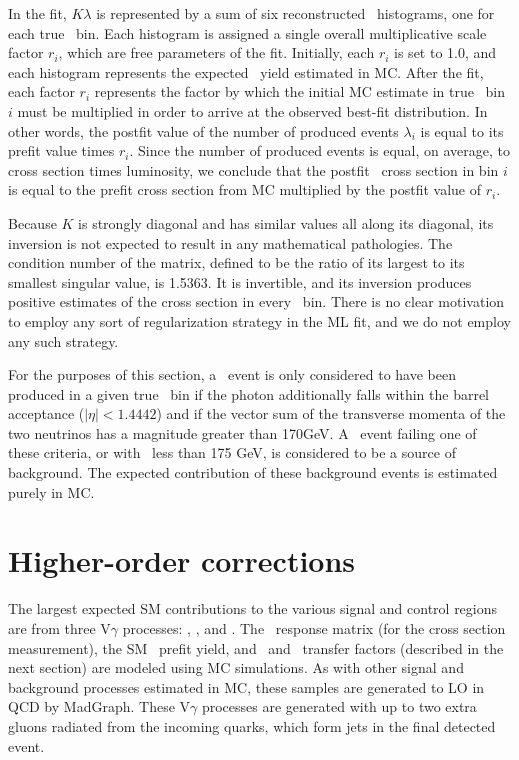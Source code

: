 In the fit, $K \lambda$ is represented by a sum of six reconstructed \ETgamma\ histograms, one for each true \pTgamma\ bin. Each histogram is assigned a single overall
multiplicative scale factor $r_{i}$, which are free parameters of the fit.
Initially, each $r_{i}$ is set to 1.0, and each histogram represents the expected \zinvg\ yield estimated in MC. After the fit, each factor $r_{i}$ represents the factor
by which the initial MC estimate in true \ETgamma\ bin $i$ must be multiplied in order to arrive at the observed best-fit distribution. In other words, the postfit value
of the number of produced events $\lambda_{i}$ is equal to its prefit value times $r_{i}$.
Since the number of produced events is equal, on average, to cross section times luminosity, we conclude that the postfit \zinvg\ cross
section in bin $i$ is equal to the prefit cross section from MC multiplied by the postfit value of $r_{i}$.

Because $K$ is strongly diagonal and has similar values all along its diagonal, its inversion is not expected to result in any mathematical pathologies.
The condition number of the matrix, defined to be the ratio of its largest to its smallest singular value, is 1.5363. It is invertible, and
its inversion produces positive estimates of the cross section in every \ETgamma\ bin. There is no clear motivation to employ any sort of regularization
strategy in the ML fit, and we do not employ any such strategy.

For the purposes of this section, a \zinvg\ event is only considered to
have been produced in a given true \pTgamma\ bin if the photon additionally falls within the barrel acceptance ($|\eta| < 1.4442$) and
if the vector sum of the transverse momenta of the two neutrinos has a magnitude greater than 170\unit{GeV}. A \zinvg\ event failing one of these
criteria, or with \ETgamma\ less than 175 GeV, is considered to be a source of background. The expected contribution of these background events is estimated
purely in MC.

\section{Higher-order corrections}
The largest expected SM contributions to the various signal and control regions are from three $\mathrm{V}\gamma$
processes: \zinvg, \wlng, and \zllg.
The \zinvg\ response matrix (for the cross section measurement), the SM \zinvg\ prefit yield,
and \wlng\ and \zllg\ transfer factors (described in the next section) are modeled using MC simulations.
As with other signal and background processes estimated in MC, these samples are generated to LO in QCD by MadGraph.
These $\mathrm{V}\gamma$ processes are generated with up to two extra gluons radiated from the incoming quarks,
which form jets in the final detected event.

